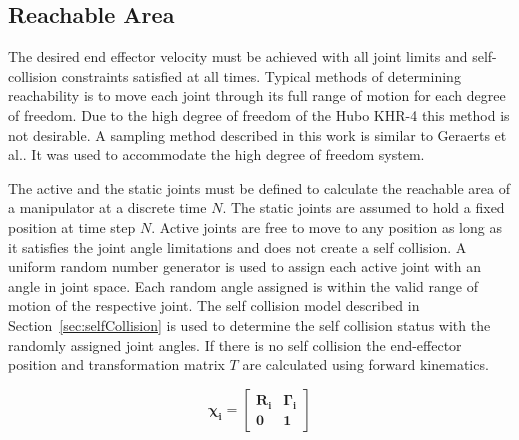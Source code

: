 \subsection{Reachable Area}\label{sec:rarea}
The desired end effector velocity must be achieved with all joint limits and self-collision constraints satisfied at all times. Typical methods of determining reachability is to move each joint through its full range of motion for each degree of freedom\cite{100034,springerlink:101007}. Due to the high degree of freedom of the Hubo KHR-4 this method is not desirable.  A sampling method described in this work is similar to Geraerts et al.\cite{1570152}.  It was used to accommodate the high degree of freedom system.

The active and the static joints must be defined to calculate the reachable area of a manipulator at a discrete time $N$.  The static joints are assumed to hold a fixed position at time step $N$.  Active joints are free to move to any position as long as it satisfies the joint angle limitations and does not create a self collision.  A uniform random number generator is used to assign each active joint with an angle in joint space.  Each random angle assigned is within the valid range of motion of the respective joint.  The self collision model described in Section~\ref{sec:selfCollision} is used to determine the self collision status with the randomly assigned joint angles.  If there is no self collision the end-effector position and transformation matrix $T$ are calculated using forward kinematics.

\begin{equation}\label{eq:fk1}
\mathbf{
\chi_i = \begin{bmatrix} R_{i} & \Gamma_{i} \\ 0 & 1 \end{bmatrix}
}
\end{equation}

